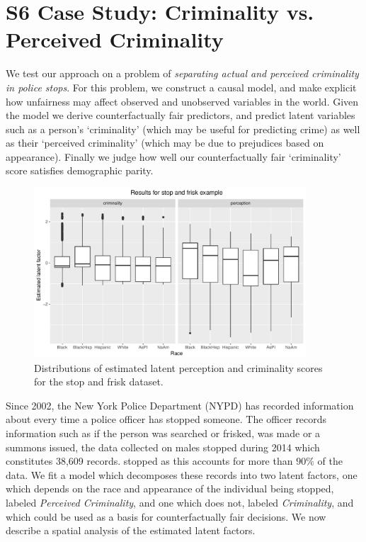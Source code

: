 \section*{S6 Case Study: Criminality vs. Perceived Criminality}
\label{sec:true-vs.-perceived}

We test our approach on a problem of \emph{separating actual and
  perceived criminality in police stops}. For this problem, we
construct a causal model, and make explicit how unfairness may affect
observed and unobserved variables in the world. Given the model we
derive counterfactually fair predictors, and predict latent variables
such as a person's `criminality' (which may be useful for predicting
crime) as well as their `perceived criminality' (which may be due to
prejudices based on appearance). Finally we judge how well our
counterfactually fair `criminality' score satisfies demographic
parity.

\begin{figure}[!th]
\begin{center}
\centerline{\includegraphics[width=4in]{stopandfrisk_output.pdf}}
\vspace{-2ex}
\caption{Distributions of estimated latent perception and criminality
  scores for the stop and frisk
  dataset.
\label{figure.stop_and_frisk_output}}
\end{center}
\end{figure}

Since 2002, the New York Police Department (NYPD) has recorded
information about every time a police officer has stopped someone. The
officer records information such as if the person was searched or
frisked, %
was made or a summons issued, %
the data collected on males stopped during 2014 which constitutes
38,609 records. %
stopped as this accounts for more than $90\%$ of the data.  We fit a
model which decomposes these records into two latent factors, one
which depends on the race and appearance of the individual being
stopped, labeled \emph{Perceived Criminality}, and one which does not,
labeled \emph{Criminality}, and which could be used as a basis for
counterfactually fair decisions. We now describe a spatial analysis of
the estimated latent factors.

